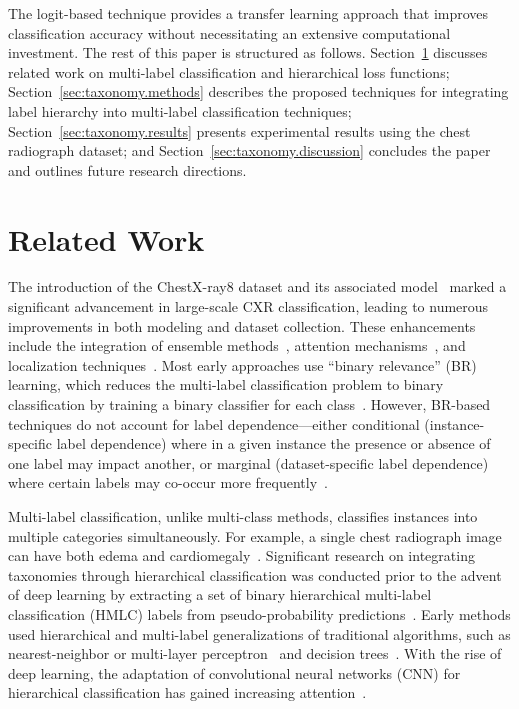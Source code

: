 \documentclass[review,1p,times,numbers]{elsarticle}
\begin{document}
The logit-based technique provides a transfer learning approach that improves classification accuracy without necessitating an extensive computational investment. The rest of this paper is structured as follows. Section~\ref{sec:taxonomy.relatedwork} discusses related work on multi-label classification and hierarchical loss functions; Section~\ref{sec:taxonomy.methods} describes the proposed techniques for integrating label hierarchy into multi-label classification techniques; Section~\ref{sec:taxonomy.results} presents experimental results using the chest radiograph dataset; and Section~\ref{sec:taxonomy.discussion} concludes the paper and outlines future research directions.

\section{Related Work}\label{sec:taxonomy.relatedwork}
The introduction of the ChestX-ray8 dataset and its associated model~\cite{wang_ChestXRay8_2017} marked a significant advancement in large-scale CXR classification, leading to numerous improvements in both modeling and dataset collection. These enhancements include the integration of ensemble methods~\cite{islam_Abnormality_2017}, attention mechanisms~\cite{guan_Diagnose_2018,liu_SDFN_2019}, and localization techniques~\cite{cai_Iterative_2018,guendel_MultiTask_2019,li_Thoracic_2018,yan_Weakly_2018}. Most early approaches use ``binary relevance'' (BR) learning, which reduces the multi-label classification problem to binary classification by training a binary classifier for each class~\cite{zhang_Review_2014}. However, BR-based techniques do not account for label dependence---either conditional (instance-specific label dependence) where in a given instance the presence or absence of one label may impact another, or marginal (dataset-specific label dependence) where certain labels may co-occur more frequently~\cite{dembczynski_Label_2012}.

Multi-label classification, unlike multi-class methods, classifies instances into multiple categories simultaneously. For example, a single chest radiograph image can have both edema and cardiomegaly~\cite{harvey_Standardised_2019,tsoumakas_MultiLabel_2007}. Significant research on integrating taxonomies through hierarchical classification was conducted prior to the advent of deep learning by extracting a set of binary hierarchical multi-label classification (HMLC) labels from pseudo-probability predictions~\cite{bi_BayesOptimal_2015}. Early methods used hierarchical and multi-label generalizations of traditional algorithms, such as nearest-neighbor or multi-layer perceptron~\cite{pourghassem_ContentBased_2008} and decision trees~\cite{dimitrovski_Hierarchical_2011}. With the rise of deep learning, the adaptation of convolutional neural networks (CNN) for hierarchical classification has gained increasing attention~\cite{guo_CNNRNN_2018,kowsari_HDLTex_2017,redmon_YOLO9000_2017,roy_TreeCNN_2020}.
\end{document}
